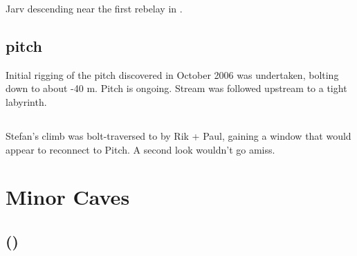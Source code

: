 \begin{marginfigure}
\caption{Jarv descending near the first rebelay in . }
\end{marginfigure}


\subsection{\protect{} \protect{}
pitch}

Initial rigging of the  pitch discovered in October 2006 was
undertaken, bolting down to about -40 m. Pitch is ongoing.
Stream was followed upstream to a tight labyrinth.

\subsection{\protect{}}

Stefan's climb was bolt-traversed to by Rik + Paul, gaining a window
that would appear to reconnect to  Pitch. A second look
wouldn't go amiss.

\section{Minor Caves}

\subsection{\protect{} (\protect{})}

